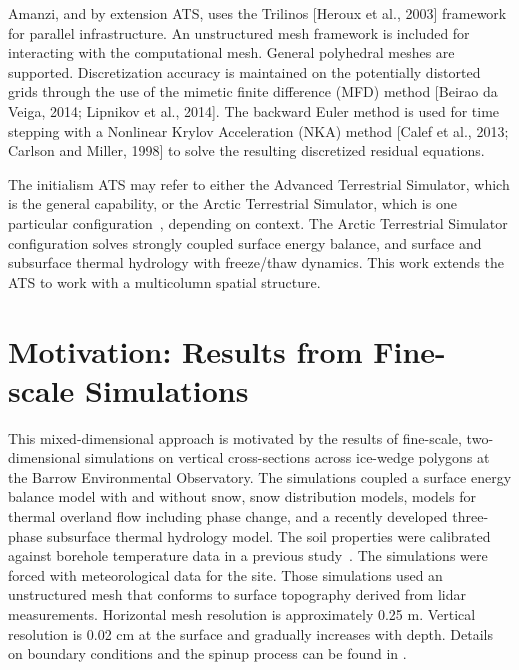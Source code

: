 \documentclass[review]{elsarticle}
\begin{document}
Amanzi, and by extension ATS, uses the Trilinos [Heroux et al., 2003] framework for parallel infrastructure. An unstructured mesh framework \cite{garimella-2014-mstk} is included for interacting with the computational mesh. General polyhedral meshes are supported. Discretization accuracy is maintained on the potentially distorted grids through the use of the mimetic finite difference (MFD) method [Beirao da Veiga, 2014; Lipnikov et al., 2014]. The backward Euler method is used for time stepping with a Nonlinear Krylov Acceleration (NKA) method [Calef et al., 2013; Carlson and Miller, 1998] to solve the resulting discretized residual equations. 

 The initialism ATS may refer to either the Advanced Terrestrial Simulator, which is the general capability, or the Arctic Terrestrial Simulator, which is one particular configuration~\cite{spainter2016integrated}, depending on context. The Arctic Terrestrial Simulator configuration solves strongly coupled surface energy balance, and surface and subsurface thermal hydrology with freeze/thaw dynamics. This work extends the ATS to work with a multicolumn spatial structure. 


\section{Motivation: Results from Fine-scale Simulations}\label{motivation}

This mixed-dimensional approach is motivated by the results of fine-scale, two-dimensional simulations on vertical cross-sections across ice-wedge polygons at the Barrow Environmental Observatory. The simulations coupled a surface energy balance model with and without snow, snow distribution models, models for thermal overland flow including phase change, and a recently developed three-phase subsurface thermal hydrology model. The soil properties were calibrated against borehole temperature data in a previous study~\cite{atchley2015}. The simulations were forced with meteorological data for the site. Those simulations used an unstructured mesh that conforms to surface topography derived from lidar measurements. Horizontal mesh resolution is approximately 0.25 m. Vertical resolution is 0.02 cm at the surface and gradually increases with depth. Details on boundary conditions and the spinup process can be found in \cite{spainter2016integrated}. 
\end{document}
